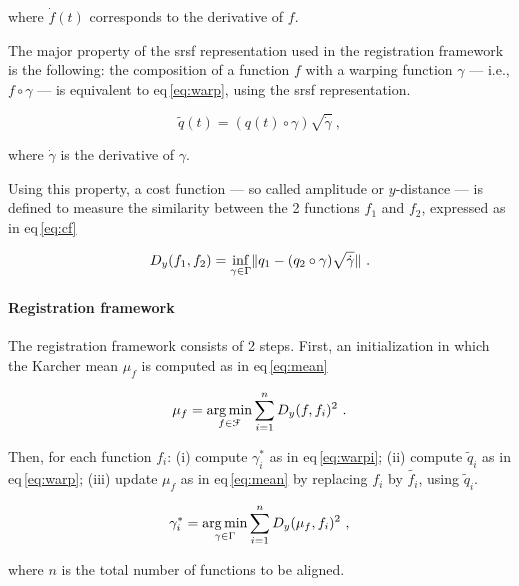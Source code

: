 \noindent where $\dot{f}(t)$ corresponds to the derivative of $f$.

The major property of the \ac{srsf} representation used in the registration framework is the following: the composition of a function $f$ with a warping function $\gamma$ --- i.e., $f \circ \gamma$ --- is equivalent to \acs{eq}\,\eqref{eq:warp}, using the \ac{srsf} representation.

\begin{equation}
  \tilde{q}(t) = (q(t) \circ \gamma) \sqrt{\dot{\gamma}} \ ,
  \label{eq:warp}
\end{equation}

\noindent where $\dot{\gamma}$ is the derivative of $\gamma$.

Using this property, a cost function --- so called amplitude or $y$-distance --- is defined to measure the similarity between the 2 functions $f_1$ and $f_2$, expressed as in \acs{eq}\,\eqref{eq:cf}

\begin{equation}
  D_y(f_1, f_2) = \underset{\gamma \in \Gamma}{\operatorname*{inf}} \| q_1 - (q_2 \circ \gamma) \sqrt{\dot{\gamma}} \| \ .
  \label{eq:cf}
\end{equation}

\paragraph{Registration framework}\label{par:chp5:T2-norm:regfra}

The registration framework consists of 2 steps.
First, an initialization in which the Karcher mean $\mu_f$ is computed as in \acs{eq}\,\eqref{eq:mean}

\begin{equation}
  \mu_f = \operatorname*{arg\,min}_{f \in \mathcal{F}} \sum_{i = 1}^{n} D_y(f, f_i)^2 \ .
  \label{eq:mean}
\end{equation}

Then, for each function $f_i$: 
(i) compute $\gamma_{i}^{*}$ as in \ac{eq}\,\eqref{eq:warpi}; 
(ii) compute $\tilde{q}_i$ as in \ac{eq}\,\eqref{eq:warp};
(iii) update $\mu_f$ as in \ac{eq}\,\eqref{eq:mean} by replacing $f_i$ by $\tilde{f_i}$, using $\tilde{q}_i$.

\begin{equation}
  \gamma_{i}^{*} = \operatorname*{arg\,min}_{\gamma \in \Gamma} \sum_{i = 1}^{n} D_y(\mu_f, f_i)^2 \ ,
  \label{eq:warpi}
\end{equation}

\noindent where $n$ is the total number of functions to be aligned.

